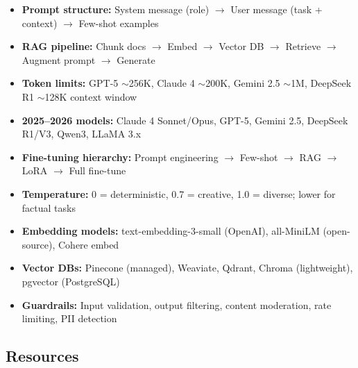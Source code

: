\documentclass[11pt, a4paper, oneside]{report}
\begin{document}
\begin{cheatsheetbox}
\begin{itemize}[leftmargin=*]
\item \textbf{Prompt structure:} System message (role) $\to$ User message (task + context) $\to$ Few-shot examples
\item \textbf{RAG pipeline:} Chunk docs $\to$ Embed $\to$ Vector DB $\to$ Retrieve $\to$ Augment prompt $\to$ Generate
\item \textbf{Token limits:} GPT-5 $\sim$256K, Claude 4 $\sim$200K, Gemini 2.5 $\sim$1M, DeepSeek R1 $\sim$128K context window
\item \textbf{2025--2026 models:} Claude 4 Sonnet/Opus, GPT-5, Gemini 2.5, DeepSeek R1/V3, Qwen3, LLaMA 3.x
\item \textbf{Fine-tuning hierarchy:} Prompt engineering $\to$ Few-shot $\to$ RAG $\to$ LoRA $\to$ Full fine-tune
\item \textbf{Temperature:} 0 = deterministic, 0.7 = creative, 1.0 = diverse; lower for factual tasks
\item \textbf{Embedding models:} text-embedding-3-small (OpenAI), all-MiniLM (open-source), Cohere embed
\item \textbf{Vector DBs:} Pinecone (managed), Weaviate, Qdrant, Chroma (lightweight), pgvector (PostgreSQL)
\item \textbf{Guardrails:} Input validation, output filtering, content moderation, rate limiting, PII detection
\end{itemize}
\end{cheatsheetbox}


\subsection*{Resources}
\end{document}
